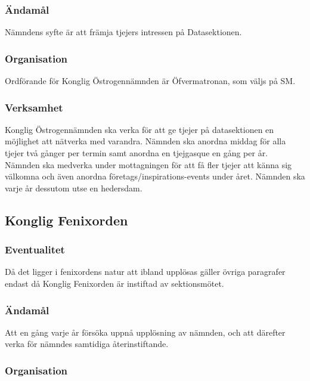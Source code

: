 \documentclass[a4paper,12pt]{article}
\begin{document}
\subsubsection{Ändamål}

Nämndens syfte är att främja tjejers intressen på Datasektionen.

\subsubsection{Organisation}

Ordförande för Konglig Östrogennämnden är Öfvermatronan, som väljs på SM.

\subsubsection{Verksamhet}

Konglig Östrogennämnden ska verka för att ge tjejer på datasektionen en möjlighet att
nätverka med varandra. Nämnden ska anordna middag för alla tjejer två gånger per
termin samt anordna en tjejgasque en gång per år. Nämnden ska medverka under
mottagningen för att få fler tjejer att känna sig välkomna och även anordna
företags/inspirations-events under året. Nämnden ska varje år dessutom utse en
hedersdam.

\subsection{Konglig Fenixorden}

\subsubsection{Eventualitet}

Då det ligger i fenixordens natur att ibland upplösas gäller övriga paragrafer endast då Konglig Fenixorden är instiftad av sektionsmötet.

\subsubsection{Ändamål}

Att en gång varje år försöka uppnå upplösning av nämnden, och att därefter verka för nämndes samtidiga återinstiftande.

\subsubsection{Organisation}
\end{document}
